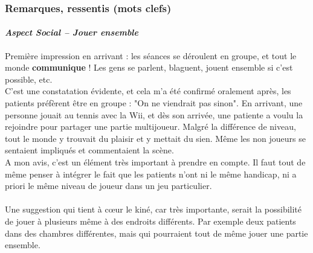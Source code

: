 	\subsubsection*{Remarques, ressentis (mots clefs) }
		\paragraph{\emph{Aspect Social – Jouer ensemble}\\}
Première impression en arrivant : les séances se déroulent en groupe, et tout le monde \textbf{communique} !
Les gens se parlent, blaguent, jouent ensemble si c'est possible, etc. \\
C'est une constatation évidente, et cela m'a été confirmé oralement après, les patients préfèrent être en groupe : "On ne viendrait pas sinon". En arrivant, une personne jouait au tennis avec la Wii, et dès son arrivée, une patiente a voulu la rejoindre pour partager une partie multijoueur. Malgré la différence de niveau, tout le monde y trouvait du plaisir et y mettait du sien. Même les non joueurs se sentaient impliqués et commentaient la scène. \\
A mon avis, c'est un élément très important à prendre en compte. Il faut tout de même penser à intégrer le fait que les patients n'ont ni le même handicap, ni a priori le même niveau de joueur dans un jeu particulier.

\paragraph{}Une suggestion qui tient à cœur le kiné, car très importante, serait la possibilité de jouer à plusieurs même à des endroits différents. Par exemple deux patients dans des chambres différentes, mais qui pourraient tout de même jouer une partie ensemble.

